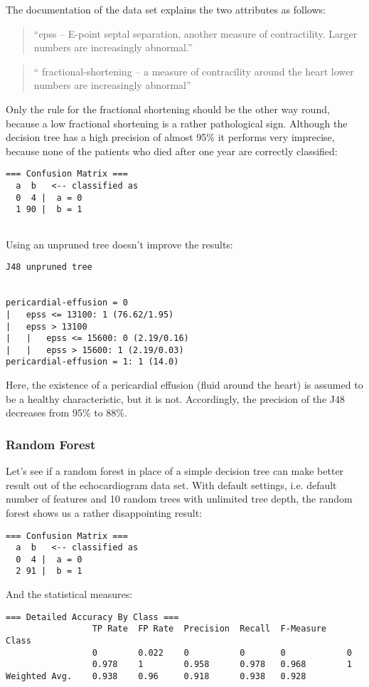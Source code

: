 \documentclass[paper=a4, fontsize=11pt]{scrartcl} %
\numberwithin{equation}{section} %
\numberwithin{figure}{section} %
\numberwithin{table}{section} %
\begin{document}
The documentation of the data set explains the two attributes as follows:
\begin{quote}
``epss -- E-point septal separation, another measure of contractility. Larger numbers are increasingly abnormal.''
\end{quote}
\begin{quote}
`` fractional-shortening -- a measure of contracility around the heart lower numbers are increasingly abnormal''
\end{quote}

Only the rule for the fractional shortening should be the other way round, because a low fractional shortening is a rather pathological sign. Although the decision tree has a high precision of almost 95\% it performs very imprecise, because none of the patients who died after one year are correctly classified:

\begin{lstlisting}
=== Confusion Matrix ===
  a  b   <-- classified as
  0  4 |  a = 0
  1 90 |  b = 1
    
\end{lstlisting}

Using an unpruned tree doesn't improve the results:
\begin{lstlisting}
J48 unpruned tree


pericardial-effusion = 0
|   epss <= 13100: 1 (76.62/1.95)
|   epss > 13100
|   |   epss <= 15600: 0 (2.19/0.16)
|   |   epss > 15600: 1 (2.19/0.03)
pericardial-effusion = 1: 1 (14.0)
\end{lstlisting}
Here, the existence of a pericardial effusion (fluid around the heart) is assumed to be a healthy characteristic, but it is not. Accordingly, the precision of the J48 decreases from 95\% to 88\%.

\subsubsection{Random Forest}
Let's see if a random forest in place of a simple decision tree can make better result out of the echocardiogram data set. With default settings, i.e. default number of features  and 10 random trees with unlimited tree depth, the random forest shows us a rather disappointing result:

\begin{lstlisting}
=== Confusion Matrix ===
  a  b   <-- classified as
  0  4 |  a = 0
  2 91 |  b = 1
\end{lstlisting}
And the statistical measures:
\begin{lstlisting}
=== Detailed Accuracy By Class ===
                 TP Rate  FP Rate  Precision  Recall  F-Measure    Class
                 0        0.022    0          0       0            0
                 0.978    1        0.958      0.978   0.968        1
Weighted Avg.    0.938    0.96     0.918      0.938   0.928     
\end{lstlisting}
\end{document}
